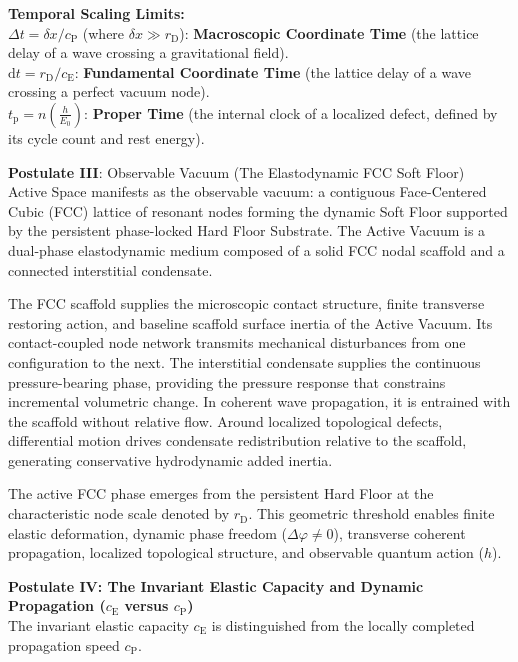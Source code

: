 \begin{itemize}
    \vspace{0.5em}
    \textbf{Temporal Scaling Limits:}\\
    $\Delta t = \delta x / c_{\mathrm{P}}$ (where $\delta x \gg r_{\mathrm{D}}$): \textbf{Macroscopic Coordinate Time} (the lattice delay of a wave crossing a gravitational field).\\
    $\mathrm{d}t = r_{\mathrm{D}} / c_{\mathrm{E}}$: \textbf{Fundamental Coordinate Time} (the lattice delay of a wave crossing a perfect vacuum node).\\
    $t_{\mathrm{p}} = n \left( \frac{h}{E_0} \right)$: \textbf{Proper Time} (the internal clock of a localized defect, defined by its cycle count and rest energy).
\end{itemize}

\vspace{1.0em}
\label{postulate:three}
\noindent\textbf{Postulate III}: Observable Vacuum (The Elastodynamic FCC Soft Floor)\\
Active Space manifests as the observable vacuum: a contiguous Face-Centered Cubic (FCC) lattice of resonant nodes forming the dynamic Soft Floor supported by the persistent phase-locked Hard Floor Substrate. The Active Vacuum is a dual-phase elastodynamic medium composed of a solid FCC nodal scaffold and a connected interstitial condensate.

The FCC scaffold supplies the microscopic contact structure, finite transverse restoring action, and baseline scaffold surface inertia of the Active Vacuum. Its contact-coupled node network transmits mechanical disturbances from one configuration to the next. The interstitial condensate supplies the continuous pressure-bearing phase, providing the pressure response that constrains incremental volumetric change. In coherent wave propagation, it is entrained with the scaffold without relative flow. Around localized topological defects, differential motion drives condensate redistribution relative to the scaffold, generating conservative hydrodynamic added inertia.

The active FCC phase emerges from the persistent Hard Floor at the characteristic node scale denoted by $r_{\mathrm D}$. This geometric threshold enables finite elastic deformation, dynamic phase freedom ($\Delta\varphi \neq 0$), transverse coherent propagation, localized topological structure, and observable quantum action ($h$).

\vspace{1.0em}
\label{postulate:four}
\noindent\textbf{Postulate IV: The Invariant Elastic Capacity and Dynamic Propagation ($c_{\mathrm{E}}$ versus $c_{\mathrm{P}}$)}\\
The invariant elastic capacity $c_{\mathrm{E}}$ is distinguished from the locally completed propagation speed $c_{\mathrm{P}}$.

